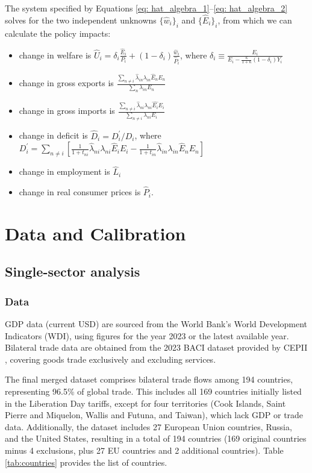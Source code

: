 \documentclass[12pt]{article}
\begin{document}
The system specified by Equations  \ref{eq: hat_algebra_1}--\ref{eq: hat_algebra_2} solves for the two independent unknowns $\{\hat{w}_i\}_i$ and $\{\hat{E}_i\}_i$, from which we can calculate the policy impacts:
\begin{itemize}
    \item change in welfare is $\hat{U}_{i}=\delta_{i}\frac{\hat{E}_{i}}{P_{i}}+(1-\delta_{i})\frac{\hat{w}_{i}}{\hat{P}_{i}}$, where  $\delta_{i}\equiv \frac{E_{i}}{E_{i}-\frac{\kappa}{1+\kappa}(1-\delta_{i})Y_{i}}$
\item change in  gross exports is $\frac{\sum_{n\neq i}\hat{\lambda}_{in}\lambda_{in}\hat{E}_{n}E_{n}}{\sum_{n}\lambda_{in}E_{n}}$
\item change in gross imports is $\frac{\sum_{n\neq i}\hat{\lambda}_{ni}\lambda_{ni}\hat{E_i}E_{i}}{\sum_{n\neq i}\lambda_{ni}E_{i}}$
\item change in deficit is $\hat{D}_{i}=D_{i}^{'}/D_{i}$, where $D_{i}^{'}=\sum_{n\neq i}\left[\frac{1}{1+t_{ni}}\hat{\lambda}_{ni}\lambda_{ni}\hat{E}_{i}E_{i}-\frac{1}{1+t_{in}}\hat{\lambda}_{in}\lambda_{in}\hat{E}_{n}E_{n}\right] $
\item change in employment is $\hat{L}_i$
\item change in real consumer prices is $\hat{P}_i$.
\end{itemize}



\section{Data and Calibration} 
\label{app:data}
\subsection{Single-sector analysis}
\subsubsection{Data}
GDP data (current USD) are sourced from the World Bank's World Development Indicators (WDI), using figures for the year 2023 or the latest available year. Bilateral trade data are obtained from the 2023 BACI dataset provided by CEPII \citep{Baci}, covering goods trade exclusively and excluding services.

The final merged dataset comprises bilateral trade flows among 194 countries, representing 96.5\% of global trade. This includes all 169 countries initially listed in the Liberation Day tariffs, except for four territories (Cook Islands, Saint Pierre and Miquelon, Wallis and Futuna, and Taiwan), which lack GDP or trade data. Additionally, the dataset includes 27 European Union countries, Russia, and the United States, resulting in a total of 194 countries (169 original countries minus 4 exclusions, plus 27 EU countries and 2 additional countries). Table \ref{tab:countries} provides the list of countries.
\end{document}

